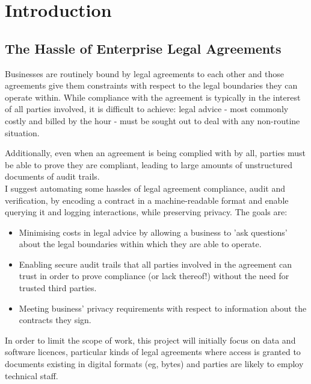 \chapter{Introduction}\label{ch:introduction}

\section*{The Hassle of Enterprise Legal Agreements}\label{sec:intro:legal-hassle}

Businesses are routinely bound by legal agreements to each other and those agreements give them constraints with respect to
the legal boundaries they can operate within.
While compliance with the agreement is typically in the interest of all parties involved, it is difficult
to achieve: legal advice - most commonly costly and billed by the hour - must be sought out to
deal with any non-routine situation.

Additionally, even when an agreement is being complied with by all, parties must be able to prove they are compliant,
leading to large amounts of unstructured documents of audit trails.\\

I suggest automating some hassles of legal agreement compliance, audit and verification, by encoding a contract
in a machine-readable format and enable querying it and logging interactions, while preserving privacy.
The goals are:
\begin{itemize}
    \item Minimising costs in legal advice by allowing a business to 'ask questions' about the legal boundaries within
    which they are able to operate.
    \item Enabling secure audit trails that all parties involved in the agreement can trust in order to prove
    compliance (or lack thereof!) without the need for trusted third parties.
    \item Meeting business' privacy requirements with respect to information about the contracts they sign.
\end{itemize}

In order to limit the scope of work, this project will initially focus on data and software licences,
particular kinds of legal agreements where access is granted to documents existing in digital formats (eg, bytes)
and parties are likely to employ technical staff.
